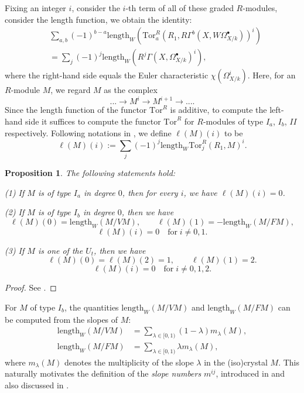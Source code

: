 \documentclass[a4paper,12pt,twoside]{report}
\newtheorem{proposition}[theorem]{Proposition}
\newcommand{\Tor}{\mathrm{Tor}}
\newcommand{\length}{\mathrm{length}}
\begin{document}
Fixing an integer $i$, consider the $i$-th term of all of these graded $R$-modules, 
consider the length function, we obtain the identity:  
\begin{equation}\label{lengtheq}
    \begin{aligned}
    &\sum_{a,b}(-1)^{b-a}\length_W(\Tor^R_a(R_1,R\Gamma^b(X,W\Omega^\bullet_{X/k}))^i)\\
    &=\sum_{j}(-1)^j\length_W(R^{j}\Gamma(X,\Omega^\bullet_{X/k})^i),
    \end{aligned}
\end{equation}
where the right-hand side equals the Euler characteristic $\chi(\Omega^i_{X/k})$. 
Here, for an $R$-module $M$, we regard $M$ as the complex \[...\rightarrow M^i\rightarrow M^{i+1}\rightarrow ....\] 
Since the length function of the functor \(\Tor^R\) is additive, 
to compute the left-hand side it suffices to compute the functor $\Tor^R$ for $R$-modules of type $I_a$, $I_b$, $II$ respectively. 
Following notations in \cite{Cr}, we define $\ell(M)(i)$ to be 
\[\ell(M)(i):=\sum_{j}(-1)^j\length_W\Tor^R_j(R_1,M)^i. \]

\begin{proposition} The following statements hold:

{\rm (1)} If $M$ is of type $I_a$ in degree $0$, then for every $i$, we have $\ell(M)(i)=0$. 

{\rm (2)} If $M$ is of type $I_b$ in degree $0$, then we have \[\ell(M)(0)=\length_W(M/VM),\qquad \ell(M)(1)=-\length_W(M/FM),\]
\[ \ell(M)(i)=0 \quad \text{for}\; i\neq 0,1.\]

{\rm (3)} If $M$ is one of the $U_t$, then we have 
\[\ell(M)(0)=\ell(M)(2)=1,\qquad \ell(M)(1)=2.\]
\[ \ell(M)(i)=0 \quad \text{for}\; i\neq 0,1,2.\]

\end{proposition}

\begin{proof}
    See \cite{Cr}. 
\end{proof}

For $M$ of type $I_b$, the quantities $\length_W(M/VM)$ and $\length_W(M/FM)$ can be computed from the slopes of $M$: 
\[\begin{aligned}
    \length _W(M/VM)&=\sum_{\lambda\in [0,1)}(1-\lambda)m_{\lambda}(M),\\
     \length _W(M/FM)&=\sum_{\lambda\in [0,1)}\lambda m_{\lambda}(M),
\end{aligned}\]
where $m_{\lambda}(M)$ denotes the multiplicity of the slope $\lambda$ in the (iso)crystal $M$. 
This naturally motivates the definition of the \emph{slope numbers} $m^{ij}$, introduced in \cite{Cr} 
and also discussed in \cite{I2}. 
\end{document}
